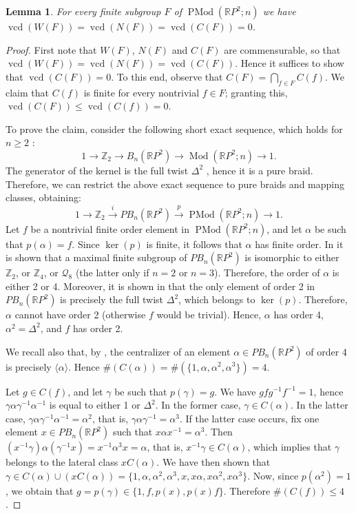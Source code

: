 \documentclass[a4paper,12pt,leqno]{amsart}
\newtheorem{lemma}[theorem]{Lemma}
\theoremstyle{definition}
\newcommand{\Z}{\mathbb{Z}}
\DeclareMathOperator{\vcd}{vcd}
\DeclareMathOperator{\mcg}{Mod}
\DeclareMathOperator{\pmcg}{PMod}
\begin{document}
\begin{lemma}\label{vcd:centra:finite:0:projec}
    For every finite subgroup $F$ of $\pmcg(\mathbb{R}P^2;n)$ we have $\vcd(W(F))=\vcd(N(F))=\vcd(C(F))=0$.
\end{lemma}
\begin{proof}
    First note that $W(F)$, $N(F)$ and $C(F)$ are commensurable, so that $\vcd(W(F))=\vcd(N(F))=\vcd(C(F))$. Hence it suffices to show that $\vcd(C(F))=0$. To this end, observe that $C(F)=\bigcap_{f\in F} C(f)$. We claim that $C(f)$ is finite for every nontrivial $f\in F$; granting this, $\vcd(C(F))\leq \vcd(C(f))=0$.

 To prove the claim, consider the following short exact sequence, which holds for $n\geq 2$  \cite[Section~2.4]{MR3382024}:
  \[
    1 \to \Z_2 \to B_n(\mathbb{R}P^2) \to \mcg(\mathbb{R}P^2;n) \to 1.
  \]
  The generator of the kernel is the full twist $\Delta^2$ \cite{MR3382024}, hence it is a pure braid. Therefore, we can restrict the above exact sequence to pure braids and mapping classes, obtaining:
  \[
    1 \to \Z_2 \stackrel{i}{\to} PB_n(\mathbb{R}P^2) \stackrel{p}{\to} \pmcg(\mathbb{R}P^2;n) \to 1.
  \]
  Let $f$ be a nontrivial finite order element in $\pmcg(\mathbb{R}P^2;n)$, and let $\alpha$ be such that $p(\alpha)=f$. Since $\ker(p)$ is finite, it follows that $\alpha$ has finite order. In \cite[Proposition~1]{MR2607582} it is shown that a maximal finite subgroup of $PB_n(\mathbb{R}P^2)$ is isomorphic to either $\mathbb{Z}_2$, or $\mathbb{Z}_4$, or $\mathcal Q_8$ (the latter only if $n=2$ or $n=3$). Therefore, the order of $\alpha$ is either 2 or 4. Moreover, it is shown in \cite[Proposition~15]{MR2100679} that the only element of order 2 in $PB_n(\mathbb{R}P^2)$ is precisely the full twist $\Delta^2$, which belongs to $\ker(p)$. Therefore, $\alpha$ cannot have order 2 (otherwise $f$ would be trivial). Hence, $\alpha$ has order 4, $\alpha^2=\Delta^2$, and $f$ has order 2.

  We recall also that, by \cite[Corollary~4]{MR2607582}, the centralizer of an element $\alpha\in PB_n(\mathbb{R}P^2)$ of order 4 is precisely $\langle \alpha\rangle$. Hence $\#(C(\alpha))=\#(\{1,\alpha,\alpha^2,\alpha^3\})=4$.

  Let $g\in C(f)$, and let $\gamma$ be such that $p(\gamma)=g$. We have $gfg^{-1}f^{-1}=1$, hence $\gamma \alpha \gamma^{-1} \alpha^{-1}$ is equal to either 1 or $\Delta^2$. In the former case, $\gamma\in C(\alpha)$. In the latter case, $\gamma \alpha \gamma^{-1} \alpha^{-1}=\alpha^2$, that is, $\gamma \alpha \gamma^{-1} = \alpha^{3}$. If the latter case occurs, fix one element $x\in PB_n(\mathbb{R}P^2)$ such that $x\alpha x^{-1}=\alpha^3$. Then $(x^{-1}\gamma)\alpha (\gamma^{-1}x) = x^{-1}\alpha^3x = \alpha$, that is, $x^{-1}\gamma\in C(\alpha)$, which implies that $\gamma$ belongs to the lateral class $xC(\alpha)$. We have then shown that $\gamma \in C(\alpha)\cup (xC(\alpha))=\{1,\alpha,\alpha^2,\alpha^3, x,x\alpha, x\alpha^2, x\alpha^3\}$. Now, since $p(\alpha^2)=1$, we obtain that $g=p(\gamma)\in \{1,f,p(x),p(x)f\}$. Therefore $\#(C(f))\leq 4$. 
\end{proof}
\end{document}
